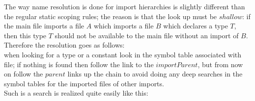\documentclass[pdflatex,11pt,letter]{article}
\begin{document}
\noindent
The way name resolution is done for import hierarchies is slightly 
different than the regular static scoping rules; the reason is that
the look up must be $shallow$: if the main file imports a file $A$ which
imports a file $B$ which declares a type $T$, then this type $T$ should not
be available to the main file without an import of $B$.\\

\noindent
Therefore the resolution goes as follows:\\

\noindent
when looking for a type or a constant look in the symbol table
associated with file; if nothing is found then follow the
link to the $importParent$, but from now on follow the $parent$
links up the chain to avoid doing any deep searches in the 
symbol tables for the imported files of other imports.\\

\noindent
Such is a search is realized quite easily like this:\\
\end{document}
